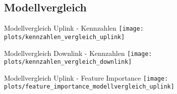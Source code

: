 \subsection{Modellvergleich}


\begin{frame}{Modellvergleich Uplink - Kennzahlen}
\texttt{[image: plots/kennzahlen\_vergleich\_uplink]}
\end{frame}

\begin{frame}{Modellvergleich Downlink - Kennzahlen}
\texttt{[image: plots/kennzahlen\_vergleich\_downlink]}
\end{frame}


\begin{frame}{Modellvergleich Uplink - Feature Importance}
\texttt{[image: plots/feature\_importance\_modellvergleich\_uplink]}
\end{frame}
